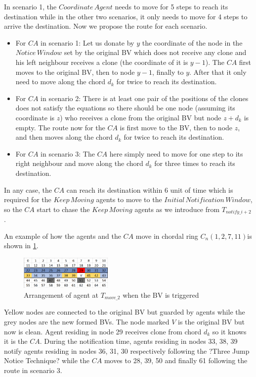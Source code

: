 \documentclass[conference]{IEEEtran}
\begin{document}
In scenario 1, the $Coordinate\,Agent$ needs to move for 5 steps to reach its destination while in the other two scenarios, it only needs to move for 4 steps to arrive the destination. Now we propose the route for each scenario.
\begin{itemize}
\item For $CA$ in scenario 1: Let us donate by $y$ the coordinate of the node in the $Notice\,Window$ set by the original BV which does not receive any clone and his left neighbour receives a clone (the coordinate of it is $y-1$). The $CA$ first moves to the original BV, then to node $y-1$, finally to $y$. After that it only need to move along the chord $d_k$ for twice to reach its destination.
\item For $CA$ in scenario 2: There is at least one pair of the positions of the clones does not satisfy the equations so there should be one node (assuming its coordinate is $z$) who receives a clone from the original BV but node $z+d_k$ is empty. The route now for the $CA$ is first move to the BV, then to node $z$, and then moves along the chord $d_k$ for twice to reach its destination.
\item For $CA$ in scenario 3: The $CA$ here simply need to move for one step to its right neighbour and move along the chord $d_k$ for three times to reach its destination.
\end{itemize}


In any case, the $CA$ can reach its destination within 6 unit of time which is required for the $Keep\,Moving$ agents to move to the $Initial\,Notification\,Window$, so the $CA$ start to chase the $Keep\,Moving$ agents as we introduce from $T_{notify\_{i+2}}$. 

An example of how the agents and the $CA$ move in chordal ring $C_n(1, 2, 7, 11)$is shown in \ref{fig:T29}. 
\begin{figure}[H]
  \centering  
  \includegraphics[width=0.4\textwidth]{figures/T29.png}
  \caption{Arrangement of agent at $T_{move\_2}$ when the BV is triggered}\label{fig:T29}
\end{figure}

Yellow nodes are connected to the original BV but guarded by agents while the grey nodes are the new formed BVs. The node marked $V$ is the original BV but now is clean. Agent residing in node 29 receives clone from chord $d_k$ so it knows it is the $CA$. During the notification time, agents residing in nodes 33, 38, 39 notify agents residing in nodes 36, 31, 30 respectively following the ?Three Jump Notice Technique? while the $CA$ moves to 28, 39, 50 and finally 61 following the route in scenario 3.
\end{document}
